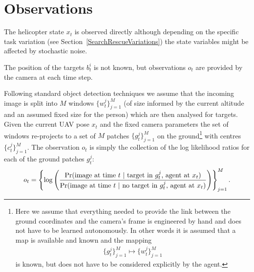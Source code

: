 \documentclass[a4paper,11pt]{report}
\newcommand{\nn}{\nonumber}
\newcommand{\pr}{{\rm Pr}}
\begin{document}
\section{Observations}

The helicopter state $x_t$ is observed directly although depending on the specific task variation (see Section~\ref{SearchRescueVariations}) the state variables might be affected by stochastic noise.

The position of the targets $b^i_t$ is not known, but observations $o_t$ are provided by the camera at each time step.

Following standard object detection techniques we assume that the incoming image is split into $M$ windows $\{w^j_t\}^M_{j=1}$  (of size informed by the current altitude and an assumed fixed size for the person) which are then analysed for targets. 
Given the current UAV pose $x_t$ and the fixed camera parameters the set of windows re-projects to a set of $M$ patches $\{g^j_t\}^M_{j=1}$ on the ground\footnote{Here we assume that everything needed to provide the link between the ground coordinates and the camera's frame is engineered by hand and does not have to be learned autonomously. In other words it is assumed that a map is available and known and the mapping
\begin{align}
\{g^j_t\}^M_{j=1} \mapsto \{w^j_t\}^M_{j=1}\nn
\end{align}
is known, but does not have to be considered explicitly by the agent.} with centres $\{c^j_t\}^M_{j=1}$.
The observation $o_t$ is simply the collection of the log likelihood ratios for each of the ground patches $g^j_t$:
\begin{align}
o_t = \left\{\log
\left(
\frac{\pr(\mbox{image at time } t~|~\mbox{target in } g^j_t \mbox{, agent at }x_t)}
{\pr(\mbox{image at time }t~|~\mbox{no target in } g^j_t \mbox{, agent at }x_t)}
\right)
\right\}^M_{j=1}. \nn
\end{align}
\end{document}
